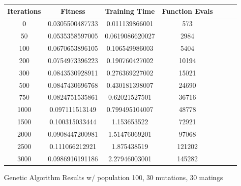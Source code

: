 \documentclass[h]{article}
\begin{document}
\begin{figure}[H] 
\begin{tabular}{ | c | c  | c | c | c | c | c |} 
\hline
\textbf{Iterations} & \textbf{Fitness} & \textbf{Training Time} & \textbf{Function Evals}   \\
\hline
0 & 0.0305500487733 & 0.011139866001 & 573 \\ \hline 
50 & 0.0535358597005 & 0.0619086620027 & 2984 \\ \hline 
100 & 0.0670653896105 & 0.106549986003 & 5404 \\ \hline 
200 & 0.0754973396223 & 0.190760427002 & 10194 \\ \hline 
300 & 0.0843530928911 & 0.276369227002 & 15021 \\ \hline 
500 & 0.0847430696768 & 0.430181398007 & 24690 \\ \hline 
750 & 0.0824751535861 & 0.62021527501 & 36716 \\ \hline 
1000 & 0.097111513149 & 0.799495104007 & 48778 \\ \hline 
1500 & 0.100315033444 & 1.153653522 & 72921 \\ \hline 
2000 & 0.0908447200981 & 1.51476069201 & 97068 \\ \hline 
2500 & 0.111066212921 & 1.875438519 & 121202 \\ \hline 
3000 & 0.0986916191186 & 2.27946003001 & 145282 \\ \hline 
\end{tabular}
\caption*{Genetic Algorithm Results w/ population 100, 30 mutations, 30 matings} 
\end{figure}
\end{document}
